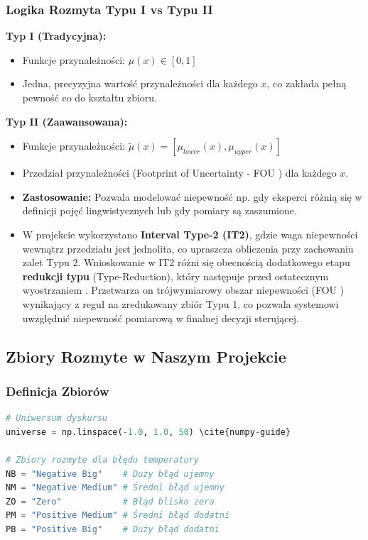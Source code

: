 \documentclass[12pt,a4paper]{article}
\begin{document}
\subsubsection{Logika Rozmyta Typu I vs Typu II}

\textbf{Typ I (Tradycyjna):}
\begin{itemize}
    \item Funkcje przynależności: $\mu(x) \in [0,1]$
    \item Jedna, precyzyjna wartość przynależności dla każdego $x$, co zakłada pełną pewność co do kształtu zbioru.
\end{itemize}

\textbf{Typ II (Zaawansowana):}
\begin{itemize}
    \item Funkcje przynależności: $\tilde{\mu}(x) = [\mu_{lower}(x), \mu_{upper}(x)]$
    \item Przedział przynależności (Footprint of Uncertainty - FOU \cite{pyit2fls-repo}) dla każdego $x$.
    \item \textbf{Zastosowanie:} Pozwala modelować niepewność np. gdy eksperci różnią się w definicji pojęć lingwistycznych lub gdy pomiary są zaszumione.
    \item W projekcie wykorzystano \textbf{Interval Type-2 (IT2)}, gdzie waga niepewności wewnątrz przedziału jest jednolita, co upraszcza obliczenia przy zachowaniu zalet Typu 2. Wnioskowanie w IT2 różni się obecnością dodatkowego etapu \textbf{redukcji typu} (Type-Reduction), który następuje przed ostatecznym wyostrzaniem \cite{pyit2fls-repo}. Przetwarza on trójwymiarowy obszar niepewności (FOU \cite{pyit2fls-repo}) wynikający z reguł na zredukowany zbiór Typu 1, co pozwala systemowi uwzględnić niepewność pomiarową w finalnej decyzji sterującej.
\end{itemize}

\subsection{Zbiory Rozmyte w Naszym Projekcie}

\subsubsection{Definicja Zbiorów}

\begin{lstlisting}[language=Python, caption={Uniwersum dyskursu}]
# Uniwersum dyskursu
universe = np.linspace(-1.0, 1.0, 50) \cite{numpy-guide}

# Zbiory rozmyte dla błędu temperatury
NB = "Negative Big"    # Duży błąd ujemny
NM = "Negative Medium" # Średni błąd ujemny  
ZO = "Zero"            # Błąd blisko zera
PM = "Positive Medium" # Średni błąd dodatni
PB = "Positive Big"    # Duży błąd dodatni
\end{lstlisting}
\end{document}
